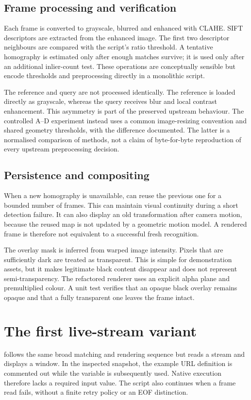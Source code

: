 \subsection{Frame processing and verification}
Each frame is converted to grayscale, blurred and enhanced with CLAHE. SIFT descriptors are extracted from the enhanced image. The first two descriptor neighbours are compared with the script's ratio threshold. A tentative homography is estimated only after enough matches survive; it is used only after an additional inlier-count test. These operations are conceptually sensible but encode thresholds and preprocessing directly in a monolithic script.

The reference and query are not processed identically. The reference is loaded directly as grayscale, whereas the query receives blur and local contrast enhancement. This asymmetry is part of the preserved upstream behaviour. The controlled A--D experiment instead uses a common image-resizing convention and shared geometry thresholds, with the difference documented. The latter is a normalised comparison of methods, not a claim of byte-for-byte reproduction of every upstream preprocessing decision.

\subsection{Persistence and compositing}
When a new homography is unavailable,  can reuse the previous one for a bounded number of frames. This can maintain visual continuity during a short detection failure. It can also display an old transformation after camera motion, because the reused map is not updated by a geometric motion model. A rendered frame is therefore not equivalent to a successful fresh recognition.

The overlay mask is inferred from warped image intensity. Pixels that are sufficiently dark are treated as transparent. This is simple for demonstration assets, but it makes legitimate black content disappear and does not represent semi-transparency. The refactored renderer uses an explicit alpha plane and premultiplied colour. A unit test verifies that an opaque black overlay remains opaque and that a fully transparent one leaves the frame intact.

\section{The first live-stream variant}
 follows the same broad matching and rendering sequence but reads a stream and displays a window. In the inspected snapshot, the example URL definition is commented out while the variable is subsequently used. Native execution therefore lacks a required input value. The script also continues when a frame read fails, without a finite retry policy or an EOF distinction.

